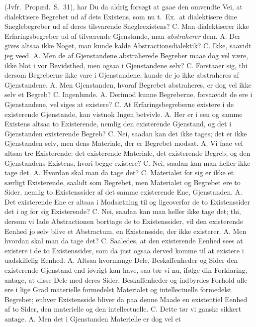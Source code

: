\documentclass[12pt,a4paper]{book}
\begin{document}
(Jvfr.\ Propæd.\ S.\ 31), har Du da aldrig forsøgt at gaae den omvendte
Vei, at dialektisere Begrebet ud
af dets Existens, som nu t.\ Ex.\ at dialektisere dine Sneglebegreber ud
af deres tilsvarende Snegleexistens? C. Man dialektiserer ikke
Erfaringsbegreber ud af tilværende Gjenstande, man \emph{abstraherer}
dem. A. Der gives altsaa ikke Noget, man kunde kalde
Abstractionsdialektik? C. Ikke, saavidt jeg veed. A. Men de af
Gjenstandene abstraherede Begreber maae dog vel være, ikke blot i vor
Bevidsthed, men ogsaa i Gjenstandene selv? C. Forstaaer sig, thi
dersom Begreberne ikke vare i Gjenstandene, kunde de jo ikke abstraheres
af Gjenstandene. A. Men Gjenstanden, hvoraf Begrebet abstraheres, er
dog vel ikke selv et Begreb? C. Ingenlunde. A. Derimod kunne
Begreberne, forsaavidt de ere i Gjenstandene, vel siges at existere?
C. At Erfaringsbegreberne existere i de existerende Gjenstande, kan
vistnok Ingen betvivle. A. Her er i een og samme Existens altsaa to
Existerende, nemlig den existerende Gjenstand, og det i Gjenstanden
existerende Begreb? C. Nei, saadan kan det ikke tages; det er ikke
Gjenstanden selv, men dens Materiale, der er Begrebet modsat. A. Vi
faae vel altsaa tre Existerende: det existerende Materiale, det
existerende Begreb, og den Gjenstandens Existens, hvori begge existere?
C. Nei, saadan kan man heller ikke tage det. A. Hvordan skal man da
tage det? C. Materialet for sig er ikke et særligt Existerende,
saalidt som Begrebet, men Materialet og Begrebet ere to Sider, nemlig to
Existenssider af det samme existerende Ene, Gjenstanden. A. Det
existerende Ene er altsaa i Modsætning til og ligeoverfor de to
Existenssider det i og for sig Existerende? C. Nei, saadan kan man
heller ikke tage det; thi, dersom vi lade Abstractionen borttage de to
Existenssider, vil den existerende Eenhed jo selv blive et Abstractum,
en Existensside, der ikke existerer. A. Men hvordan skal man da tage
det? C. Saaledes, at den existerende Eenhed sees at existere i de to
Existenssider, som da just ogsaa derved komme til at existere i
uadskillelig Eenhed. A. Altsaa hvormange Dele,
Beskaffenheder og Sider den existerende Gjenstand end iøvrigt kan have,
saa tør vi nu, ifølge din Forklaring, antage, at disse Dele med deres
Sider, Beskaffenheder og indbyrdes Forhold alle ere i lige Grad
materielle formedelst Materialet og intellectuelle formedelst Begrebet;
enhver Existensside bliver da paa denne Maade en existentiel Eenhed af
to Sider, den materielle og den intellectuelle. C. Dette tør vi ganske
sikkert antage. A. Men det i Gjenstanden Materielle er dog vel et
\end{document}
